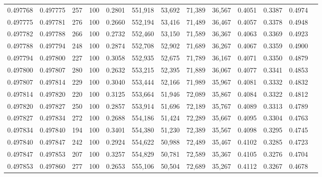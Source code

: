\begin{tabular}{rrrrrrrrrrrrr}
0.497768 & 0.497775 &   257 & 100 &                                     0.2801 & 551,918 &  53,692 &  71,389 &  36,567 & 0.4051 & 0.3387 & 0.4974 \\
0.497775 & 0.497781 &   276 & 100 &                                     0.2660 & 552,194 &  53,416 &  71,489 &  36,467 & 0.4057 & 0.3378 & 0.4948 \\
0.497782 & 0.497788 &   266 & 100 &                                     0.2732 & 552,460 &  53,150 &  71,589 &  36,367 & 0.4063 & 0.3369 & 0.4923 \\
0.497788 & 0.497794 &   248 & 100 &                                     0.2874 & 552,708 &  52,902 &  71,689 &  36,267 & 0.4067 & 0.3359 & 0.4900 \\
0.497794 & 0.497800 &   227 & 100 &                                     0.3058 & 552,935 &  52,675 &  71,789 &  36,167 & 0.4071 & 0.3350 & 0.4879 \\
0.497800 & 0.497807 &   280 & 100 &                                     0.2632 & 553,215 &  52,395 &  71,889 &  36,067 & 0.4077 & 0.3341 & 0.4853 \\
0.497807 & 0.497814 &   229 & 100 &                                     0.3040 & 553,444 &  52,166 &  71,989 &  35,967 & 0.4081 & 0.3332 & 0.4832 \\
0.497814 & 0.497820 &   220 & 100 &                                     0.3125 & 553,664 &  51,946 &  72,089 &  35,867 & 0.4084 & 0.3322 & 0.4812 \\
0.497820 & 0.497827 &   250 & 100 &                                     0.2857 & 553,914 &  51,696 &  72,189 &  35,767 & 0.4089 & 0.3313 & 0.4789 \\
0.497827 & 0.497834 &   272 & 100 &                                     0.2688 & 554,186 &  51,424 &  72,289 &  35,667 & 0.4095 & 0.3304 & 0.4763 \\
0.497834 & 0.497840 &   194 & 100 &                                     0.3401 & 554,380 &  51,230 &  72,389 &  35,567 & 0.4098 & 0.3295 & 0.4745 \\
0.497840 & 0.497847 &   242 & 100 &                                     0.2924 & 554,622 &  50,988 &  72,489 &  35,467 & 0.4102 & 0.3285 & 0.4723 \\
0.497847 & 0.497853 &   207 & 100 &                                     0.3257 & 554,829 &  50,781 &  72,589 &  35,367 & 0.4105 & 0.3276 & 0.4704 \\
0.497853 & 0.497860 &   277 & 100 &                                     0.2653 & 555,106 &  50,504 &  72,689 &  35,267 & 0.4112 & 0.3267 & 0.4678 \\

\end{tabular}
